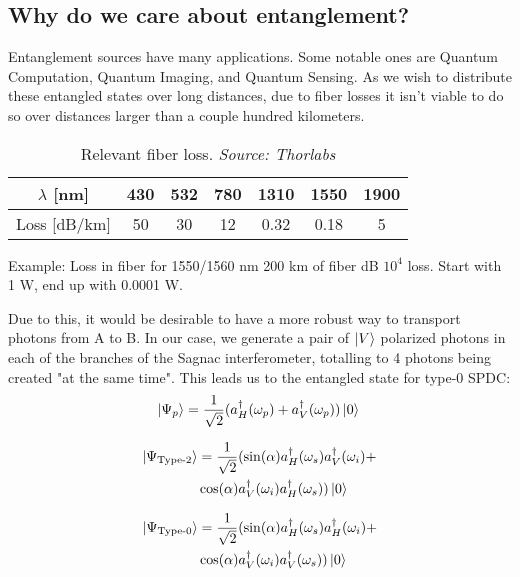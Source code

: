 \documentclass{article}
\begin{document}
\subsection{Why do we care about entanglement?}
Entanglement sources have many applications. Some notable ones are Quantum Computation, Quantum Imaging, and Quantum Sensing.
As we wish to distribute these entangled states over long distances, due to fiber losses it isn't viable to do so 
over distances larger than a couple hundred kilometers.
\begin{center}
	\begin{table}[h]
		\caption{Relevant fiber loss. \textit{Source: Thorlabs}}
		\label{tab:fiberloss}
		\begin{tabular}{|c|c|c|c|c|c|c|}
			\hline
			$\lambda$ [nm] & 430 & 532 & 780 & 1310 & 1550 & 1900\\
			\hline
			Loss [dB/km] & 50 & 30 & 12 & 0.32 &  0.18 & 5\\
			\hline
		\end{tabular}
	\end{table}
\end{center}
\begin{exampleblock}{Example: Loss in fiber for 1550/1560 nm}
	200 km of fiber  dB \rightarrow $10^4$ loss.
	Start with 1 W, end up with 0.0001 W.
\end{exampleblock}
Due to this, it would be desirable to have a more robust way to transport photons from A to B.
In our case, we generate a pair of $\ket{V}$ polarized photons in each of the branches of the Sagnac interferometer, totalling
to 4 photons being created "at the same time". This leads us to the entangled state for type-0 SPDC:
\begin{equation*}
	\ket{\Psi_{p}} = \frac{1}{\sqrt{2}} ( a_{H}^{\dagger} ( \omega_p ) + a_{V}^{\dagger} ( \omega_p ) )\ket{0}\\
\end{equation*}
\begin{minipage}[l]{0.48\textwidth}
	\begin{equation}
		\begin{aligned}
			\ket{\Psi_{\text{Type-2}}} &= \frac{1}{\sqrt{2}}(\sin(\alpha)a_{H}^{\dagger}(\omega_s)a_{V}^{\dagger}(\omega_i)+\\
								&\cos(\alpha)a_{V}^{\dagger}(\omega_i)a_{H}^{\dagger}(\omega_s))\ket{0}\\
		\end{aligned}
	\end{equation}
\end{minipage}
\begin{minipage}[r]{0.48\textwidth}
\begin{equation}
	\begin{aligned}
		\ket{\Psi_{\text{Type-0}}} &= \frac{1}{\sqrt{2}}(\sin(\alpha)a_{H}^{\dagger}(\omega_s)a_{H}^{\dagger}(\omega_i)+\\
								   &\cos(\alpha)a_{V}^{\dagger}(\omega_i)a_{V}^{\dagger}(\omega_s))\ket{0}
	\end{aligned}
\end{equation}
\end{minipage}
\end{document}
